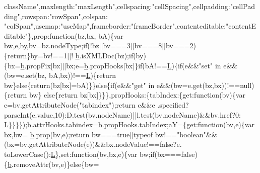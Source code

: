 \begin{DoxyCode}
{      className"},maxlength:\textcolor{stringliteral}{"maxLength"},cellspacing:\textcolor{stringliteral}{"cellSpacing"},cellpadding:\textcolor{stringliteral}{"cellPadding"},rowspan:\textcolor{stringliteral}{"rowSpan"},colspan:\textcolor{stringliteral}{
      "colSpan"},usemap:\textcolor{stringliteral}{"useMap"},frameborder:\textcolor{stringliteral}{"frameBorder"},contenteditable:\textcolor{stringliteral}{"contentEditable"}\},prop:\textcolor{keyword}{function}(bz,bx,
      bA)\{var bw,e,by,bv=bz.nodeType;\textcolor{keywordflow}{if}(!bz||bv===3||bv===8||bv===2)\{\textcolor{keywordflow}{return}\}by=bv!==1||!
      \hyperlink{a00039_aa4026ad5544b958e54ce5e106fa1c805}{b}.isXMLDoc(bz);\textcolor{keywordflow}{if}(by)\{bx=\hyperlink{a00039_aa4026ad5544b958e54ce5e106fa1c805}{b}.propFix[bx]||bx;e=\hyperlink{a00039_aa4026ad5544b958e54ce5e106fa1c805}{b}.propHooks[bx]\}\textcolor{keywordflow}{if}(bA!==\hyperlink{a00039_a38ee4c0b5f4fe2a18d0c783af540d253}{L})\{\textcolor{keywordflow}{if}(e&&\textcolor{stringliteral}{"set"} in e&&(bw=e.set(bz,
      bA,bx))!==\hyperlink{a00039_a38ee4c0b5f4fe2a18d0c783af540d253}{L})\{\textcolor{keywordflow}{return} bw\}\textcolor{keywordflow}{else}\{\textcolor{keywordflow}{return}(bz[bx]=bA)\}\}\textcolor{keywordflow}{else}\{\textcolor{keywordflow}{if}(e&&\textcolor{stringliteral}{"get"} in e&&(bw=e.get(bz,bx))!==null)\{\textcolor{keywordflow}{return} bw\}\textcolor{keywordflow}{
      else}\{\textcolor{keywordflow}{return} bz[bx]\}\}\},propHooks:\{tabIndex:\{\textcolor{keyword}{get}:\textcolor{keyword}{function}(bv)\{var e=bv.getAttributeNode(\textcolor{stringliteral}{"tabindex"});\textcolor{keywordflow}{return} e&&e
      .specified?parseInt(e.value,10):D.test(bv.nodeName)||l.test(bv.nodeName)&&bv.href?0:
      \hyperlink{a00039_a38ee4c0b5f4fe2a18d0c783af540d253}{L}\}\}\}\});\hyperlink{a00039_aa4026ad5544b958e54ce5e106fa1c805}{b}.attrHooks.tabindex=\hyperlink{a00039_aa4026ad5544b958e54ce5e106fa1c805}{b}.propHooks.tabIndex;aY=\{\textcolor{keyword}{get}:\textcolor{keyword}{function}(bv,e)\{var bx,bw=
      \hyperlink{a00039_aa4026ad5544b958e54ce5e106fa1c805}{b}.prop(bv,e);\textcolor{keywordflow}{return} bw===\textcolor{keyword}{true}||typeof bw!==\textcolor{stringliteral}{"boolean"}&&(bx=bv.getAttributeNode(e))&&bx.nodeValue!==\textcolor{keyword}{false}?e.
      toLowerCase():\hyperlink{a00039_a38ee4c0b5f4fe2a18d0c783af540d253}{L}\},set:\textcolor{keyword}{function}(bv,bx,e)\{var bw;\textcolor{keywordflow}{if}(bx===\textcolor{keyword}{false})\{\hyperlink{a00039_aa4026ad5544b958e54ce5e106fa1c805}{b}.removeAttr(bv,e)\}\textcolor{keywordflow}{else}\{bw=

\end{DoxyCode}
